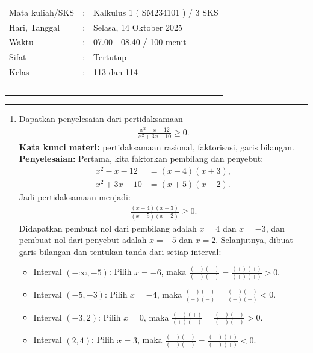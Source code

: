 \documentclass[10pt,openany,a4paper]{article}
\theoremstyle{definition}
\theoremstyle{definition}
\theoremstyle{plain}
\newenvironment{jawab}[2][tes]{
\textbf{Kata kunci materi:} #1.\\
\textbf{Penyelesaian:} #2
}{}
\begin{document}
    \begin{center}
	\begin{tabular}{lcl}
		Mata kuliah/SKS & : & Kalkulus 1 ( SM234101 ) / 3 SKS\\
		Hari, Tanggal & : & Selasa, 14 Oktober 2025\\
		Waktu & : & 07.00 - 08.40 / 100 menit\\
		Sifat & : & Tertutup\\
		Kelas & : & 113 dan 114\\
  ~
	\end{tabular}
    
    \noindent\rule{\textwidth}{2.pt}
        \end{center}
        \begin{enumerate}
            \item Dapatkan penyelesaian dari pertidaksamaan 
            \begin{align*}
                \frac{x^2-x-12}{x^2+3x-10}\geq 0.
            \end{align*}
            \begin{jawab}[pertidaksamaan rasional, faktorisasi, garis bilangan]{
                Pertama, kita faktorkan pembilang dan penyebut:
                \begin{align*}
                    x^2 - x - 12 &= (x-4)(x+3),\\
                    x^2 + 3x - 10 &= (x+5)(x-2).
                \end{align*}
                Jadi pertidaksamaan menjadi:
                \begin{align*}
                    \frac{(x-4)(x+3)}{(x+5)(x-2)} \geq 0.
                \end{align*}
                Didapatkan pembuat nol dari pembilang adalah $x=4$ dan $x=-3$, dan pembuat nol dari penyebut adalah $x=-5$ dan $x=2$. Selanjutnya, dibuat garis bilangan dan tentukan tanda dari setiap interval:
                \begin{itemize}
                    \item Interval $(-\infty, -5)$: Pilih $x=-6$, maka $\frac{(-)(-)}{(-)(-)} = \frac{(+)(+)}{(+)(+)} > 0$.
                    \item Interval $(-5, -3)$: Pilih $x=-4$, maka $\frac{(-)(-)}{(+)(-)} = \frac{(+)(+)}{(-)(-)} < 0$.
                    \item Interval $(-3, 2)$: Pilih $x=0$, maka $\frac{(-)(+)}{(+)(-)} = \frac{(-)(+)}{(+)(-)} > 0$.
                    \item Interval $(2, 4)$: Pilih $x=3$, maka $\frac{(-)(+)}{(+)(+)} = \frac{(-)(+)}{(+)(+)} < 0$.

\end{itemize}}
\end{jawab}
\end{enumerate}
\end{document}
